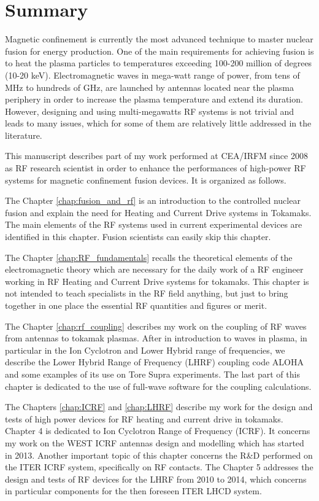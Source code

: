 \chapter*{Summary}

Magnetic confinement is currently the most advanced technique to master nuclear fusion for energy production. One of the main requirements for achieving fusion is to heat the plasma particles to temperatures exceeding 100-200 million of degrees (10-20 keV). Electromagnetic waves in mega-watt range of power, from tens of MHz to hundreds of GHz, are launched by antennas located near the plasma periphery in order to increase the plasma temperature and extend its duration. However, designing and using multi-megawatts RF systems is not trivial and leads to many issues, which for some of them  are relatively little addressed in the literature. 

This manuscript describes part of my work performed at CEA/IRFM since 2008 as RF research scientist in order to enhance the performances of high-power RF systems for magnetic confinement fusion devices. It is organized as follows. 

The Chapter \ref{chap:fusion_and_rf} is an introduction to the controlled nuclear fusion and explain the need for Heating and Current Drive systems in Tokamaks. The main elements of the RF systems used in current experimental devices are identified in this chapter. Fusion scientists can easily skip this chapter. 

The Chapter \ref{chap:RF_fundamentals} recalls the theoretical elements of the electromagnetic theory which are necessary for the daily work of a RF engineer working in RF Heating and Current Drive systems for tokamaks. This chapter is not intended to teach specialists in the RF field anything, but just to bring together in one place the essential RF quantities and figures or merit. 

The Chapter \ref{chap:rf_coupling} describes my work on the coupling of RF waves from antennas to tokamak plasmas. After in introduction to waves in plasma, in particular in the Ion Cyclotron and Lower Hybrid range of frequencies, we describe the Lower Hybrid Range of Frequency (LHRF) coupling code ALOHA and some examples of its use on Tore Supra experiments. The last part of this chapter is dedicated to the use of full-wave software for the coupling calculations.

The Chapters \ref{chap:ICRF} and \ref{chap:LHRF} describe my work for the design and tests of high power devices for RF heating and current drive in tokamaks. Chapter 4 is dedicated to Ion Cyclotron Range of Frequency (ICRF). It concerns my work on the WEST ICRF antennas design and modelling which has started in 2013. Another important topic of this chapter concerns the R\&D performed on the ITER ICRF system, specifically on RF contacts. The Chapter 5 addresses the design and tests of RF devices for the LHRF from 2010 to 2014, which concerns in particular components for the then foreseen ITER LHCD system.

